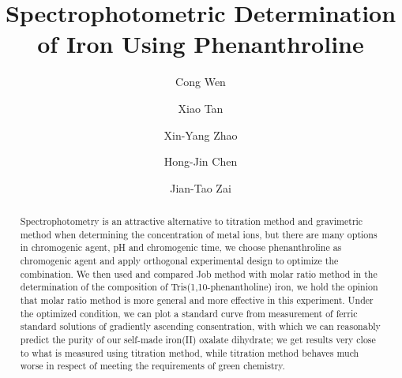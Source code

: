 \documentclass[journal=jacsat,manuscript=article]{achemso}
\author{Cong Wen}
\author{Xiao Tan}
\author{Xin-Yang Zhao}
\author{Hong-Jin Chen}
\author{Jian-Tao Zai}
\affiliation[SJTU]
    {School of Chemistry and Chemical Engineering, Shanghai Jiao Tong University, Shanghai 200240, P. R. China}
\title{Spectrophotometric Determination of Iron Using Phenanthroline}
\begin{document}

\begin{abstract}

\textsf{Spectrophotometry} is an attractive alternative to titration method and gravimetric method when determining the concentration of metal ions, but there are many options in chromogenic agent, pH and chromogenic time, we choose phenanthroline as chromogenic agent and apply \textsf{orthogonal experimental design} to optimize the combination. We then used and compared \textsf{Job method} with \textsf{molar ratio method} in the determination of the composition of Tris(1,10-phenantholine) iron, we hold the opinion that molar ratio method is more general and more effective in this experiment. Under the optimized condition, we can plot a standard curve from measurement of ferric standard solutions of gradiently ascending consentration, with which we can reasonably predict the purity of our self-made iron(II) oxalate dihydrate; we get results very close to what is measured using titration method, while titration method behaves much worse in respect of meeting the requirements of green chemistry.

\end{abstract}

\end{document}
